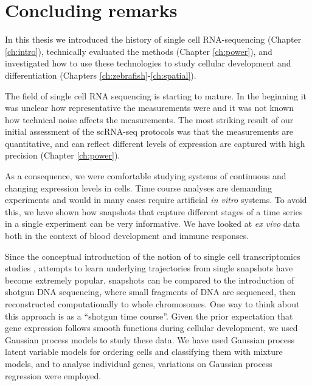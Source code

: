 
\chapter{Concluding remarks}

In this thesis we introduced the history of single cell RNA-sequencing (Chapter \ref{ch:intro}), technically evaluated the methods (Chapter \ref{ch:power}), and investigated how to use these technologies to study cellular development and differentiation (Chapters \ref{ch:zebrafish}-\ref{ch:spatial}).

The field of single cell RNA sequencing is starting to mature. In the beginning it was unclear how representative the measurements were and it was not known how technical noise affects the measurements. The most striking result of our initial assessment of the scRNA-seq protocols was that the measurements are quantitative, and can reflect different levels of expression are captured with high precision (Chapter \ref{ch:power}).

As a consequence, we were comfortable studying systems of continuous and changing expression levels in cells. Time course analyses are demanding experiments and would in many cases require artificial \textit{in vitro} systems. To avoid this, we have shown how snapshots that capture different stages of a time series in a single experiment can be very informative. We have looked at \textit{ex vivo} data both in the context of blood development and immune responses.

Since the conceptual introduction of the notion of  to single cell transcriptomics studies \cite{Trapnell2014-cn}, attempts to learn underlying trajectories from single snapshots have become extremely popular.  snapshots can be compared to the introduction of shotgun DNA sequencing, where small fragments of DNA are sequenced, then reconstructed computationally to whole chromosomes. One way to think about this approach is as a ``shotgun time course''. Given the prior expectation that gene expression follows smooth functions during cellular development, we used Gaussian process models to study these data. We have used Gaussian process latent variable models for ordering cells and classifying them with mixture models, and to analyse individual genes, variations on Gaussian process regression were employed.

